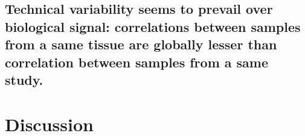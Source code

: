 \subsection{Technical variability seems to prevail over biological signal:
correlations between samples from a same tissue are globally lesser than
correlation between samples from a same study.}


\section{Discussion}


